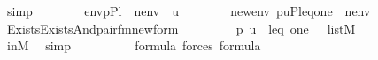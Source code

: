 \begin{isabellebody}
\ simp\isanewline
\ \ \ \ \ \ \isamarkupfalse%
\ {\isacharquery}{\kern0pt}env{\isacharequal}{\kern0pt}{\isachardoublequoteopen}{\isacharbrackleft}{\kern0pt}p{\isacharbrackright}{\kern0pt}{\isacharat}{\kern0pt}{\isacharquery}{\kern0pt}Pl{}{\isacharat}{\kern0pt}{\isacharbrackleft}{\kern0pt}{\isasymtheta}{\isacharbrackright}{\kern0pt}\ {\isacharat}{\kern0pt}\ nenv\ {\isacharat}{\kern0pt}\ {\isacharbrackleft}{\kern0pt}{\isasympi}{\isacharcomma}{\kern0pt}u{\isacharbrackright}{\kern0pt}{\isachardoublequoteclose}\isanewline
\ \ \ \ \ \ \isamarkupfalse%
\ {\isacharquery}{\kern0pt}new{\isacharunderscore}{\kern0pt}env{\isacharequal}{\kern0pt}{\isachardoublequoteopen}\ {\isacharbrackleft}{\kern0pt}{\isasymtheta}{\isacharcomma}{\kern0pt}p{\isacharcomma}{\kern0pt}u{\isacharcomma}{\kern0pt}P{\isacharcomma}{\kern0pt}leq{\isacharcomma}{\kern0pt}one{\isacharcomma}{\kern0pt}{\isasympi}{\isacharbrackright}{\kern0pt}\ {\isacharat}{\kern0pt}\ nenv{\isachardoublequoteclose}\isanewline
\ \ \ \ \ \ \isamarkupfalse%
\ {\isacharquery}{\kern0pt}{\isasympsi}{\isacharequal}{\kern0pt}{\isachardoublequoteopen}Exists{\isacharparenleft}{\kern0pt}Exists{\isacharparenleft}{\kern0pt}And{\isacharparenleft}{\kern0pt}pair{\isacharunderscore}{\kern0pt}fm{\isacharparenleft}{\kern0pt}{}{\isacharcomma}{\kern0pt}{}{\isacharcomma}{\kern0pt}{}{\isacharparenright}{\kern0pt}{\isacharcomma}{\kern0pt}{\isacharquery}{\kern0pt}new{\isacharunderscore}{\kern0pt}form{\isacharparenright}{\kern0pt}{\isacharparenright}{\kern0pt}{\isacharparenright}{\kern0pt}{\isachardoublequoteclose}\isanewline
\ \ \ \ \ \ \isamarkupfalse%
\ {\isachardoublequoteopen}{\isacharbrackleft}{\kern0pt}{\isasymtheta}{\isacharcomma}{\kern0pt}\ p{\isacharcomma}{\kern0pt}\ u{\isacharcomma}{\kern0pt}\ {\isasympi}{\isacharcomma}{\kern0pt}\ leq{\isacharcomma}{\kern0pt}\ one{\isacharcomma}{\kern0pt}\ {\isasympi}{\isacharbrackright}{\kern0pt}\ {\isasymin}\ list{\isacharparenleft}{\kern0pt}M{\isacharparenright}{\kern0pt}{\isachardoublequoteclose}\ \isanewline
\ \ \ \ \ \ \ \ \isamarkupfalse%
\ in{\isacharunderscore}{\kern0pt}M{\isacharprime}{\kern0pt}\ \isamarkupfalse%
\ simp\isanewline
\ \ \ \ \ \ \isamarkupfalse%
\ {\isachardoublequoteopen}{\isacharquery}{\kern0pt}{\isasymchi}\ {\isasymin}\ formula{\isachardoublequoteclose}\ {\isachardoublequoteopen}forces{\isacharparenleft}{\kern0pt}{\isacharquery}{\kern0pt}{\isasymchi}{\isacharparenright}{\kern0pt}{\isasymin}\ formula{\isachardoublequoteclose}\ \ \isanewline

\end{isabellebody}
